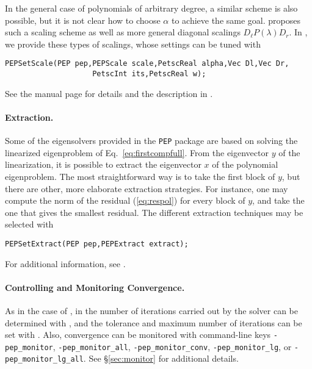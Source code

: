 In the general case of polynomials of arbitrary degree, a similar scheme is also possible, but it is not clear how to choose $\alpha$ to achieve the same goal. \cite{Betcke:2008:OSG} proposes such a scaling scheme as well as more general diagonal scalings $D_\ell P(\lambda)D_r$. In \slepc, we provide these types of scalings, whose settings can be tuned with
	\begin{Verbatim}[fontsize=\small]
	PEPSetScale(PEP pep,PEPScale scale,PetscReal alpha,Vec Dl,Vec Dr,
                    PetscInt its,PetscReal w);
	\end{Verbatim}
See the manual page for details and the description in \citep{Campos:2016:PKS}.

\paragraph{Extraction.}

Some of the eigensolvers provided in the \texttt{PEP} package are based on solving the linearized eigenproblem of Eq.\ \ref{eq:firstcompfull}. From the eigenvector $y$ of the linearization, it is possible to extract the eigenvector $x$ of the polynomial eigenproblem. The most straightforward way is to take the first block of $y$, but there are other, more elaborate extraction strategies. For instance, one may compute the norm of the residual (\ref{eq:respol}) for every block of $y$, and take the one that gives the smallest residual. The different extraction techniques may be selected with
	\begin{Verbatim}[fontsize=\small]
	PEPSetExtract(PEP pep,PEPExtract extract);
	\end{Verbatim}
For additional information, see \citep{Campos:2016:PKS}.

\paragraph{Controlling and Monitoring Convergence.}

As in the case of , in  the number of iterations carried out by the solver can be determined with , and the tolerance and maximum number of iterations can be set with . Also, convergence can be monitored with command-line keys \Verb!-pep_monitor!, \Verb!-pep_monitor_all!, \Verb!-pep_monitor_conv!, \Verb!-pep_monitor_lg!, or \Verb!-pep_monitor_lg_all!. See \S\ref{sec:monitor} for additional details.

